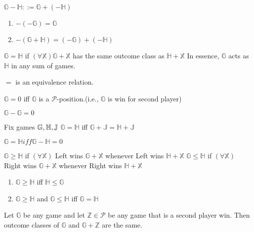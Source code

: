 \documentclass[12pt]{beamer}
\begin{document}
\begin{frame}

\begin{definition}
$\mathbb{G-H ::= G + (-H) }$
\end{definition}
\pause
\begin{lemma}
\begin{enumerate}
     \item $\mathbb{-(-G) = G}$
     \item $\mathbb{-(G+H) = (-G) + (-H)}$
\end{enumerate}
\end{lemma}

\pause
\begin{definition}
 $\mathbb{G=H}$ if $(\forall \mathbb{X}) \mathbb{G+X} $ has the same
outcome class as $\mathbb{H+X}$\break
 In essence, $\mathbb{G}$ acts as $\mathbb{H}$ in any sum of games.
 \end{definition}
\pause
\begin{lemma}
 $=$ is an equivalence relation.
\end{lemma}
\end{frame}

\begin{frame}
\begin{theorem}
 $\mathbb{G} = 0$ iff $\mathbb{G}$ is a $\mathcal{P}$-position.(i.e., $\mathbb{G}$ is win
for second player)
\end{theorem}
\pause
 \begin{corollary}
 $\mathbb{G-G} = 0$
 \end{corollary}
\pause
 \begin{theorem}
  Fix games $\mathbb{G,H,J}\break$\break
  $\mathbb{G=H}$ iff $\mathbb{G+J=H+J}$
 \end{theorem}
\pause
 \begin{corollary}
 $\mathbb{G=H} iff \mathbb{G-H}=0$\break
 \end{corollary}
\end{frame}

\begin{frame}

\begin{definition}
$\mathbb{G \geq H}$ if $\mathbb{(\forall X)}$ Left wins $\mathbb{G+X}$
whenever Left wins $\mathbb{H+X}$\break
$\mathbb{G \leq H}$ if $\mathbb{(\forall X)}$ Right wins $\mathbb{G+X}$
whenever Right wins $\mathbb{H+X}$
\end{definition}
\pause
\begin{lemma}
 \begin{enumerate}
     \item $\mathbb{G \geq H}$ iff $\mathbb{H \leq G}$
     \item $\mathbb{G \geq H}$ and $\mathbb{G \leq H}$ iff $\mathbb{G=H}$
 \end{enumerate}
\end{lemma}
\pause
\begin{theorem}
Let $\mathbb{G}$ be any game and let $\mathbb{Z} \in \mathcal{P}$ be any game that is a second player win. Then outcome classes of $\mathbb{G}$ and $\mathbb{G+Z}$ are the same.
\end{theorem}
\end{frame}
\end{document}
